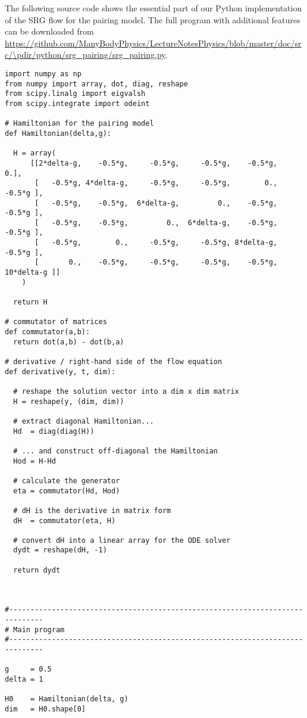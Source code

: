 The following source code shows the essential part of our Python implementation of
the SRG flow for the pairing model. The full program with additional features can 
be downloaded from 
\url{https://github.com/ManyBodyPhysics/LectureNotesPhysics/blob/master/doc/src/\pdir/python/srg_pairing/srg_pairing.py}.


\begin{lstlisting}
import numpy as np
from numpy import array, dot, diag, reshape
from scipy.linalg import eigvalsh
from scipy.integrate import odeint

# Hamiltonian for the pairing model
def Hamiltonian(delta,g):

  H = array(
      [[2*delta-g,    -0.5*g,     -0.5*g,     -0.5*g,    -0.5*g,          0.],
       [   -0.5*g, 4*delta-g,     -0.5*g,     -0.5*g,        0.,     -0.5*g ], 
       [   -0.5*g,    -0.5*g,  6*delta-g,         0.,    -0.5*g,     -0.5*g ], 
       [   -0.5*g,    -0.5*g,         0.,  6*delta-g,    -0.5*g,     -0.5*g ], 
       [   -0.5*g,        0.,     -0.5*g,     -0.5*g, 8*delta-g,     -0.5*g ], 
       [       0.,    -0.5*g,     -0.5*g,     -0.5*g,    -0.5*g, 10*delta-g ]]
    )

  return H

# commutator of matrices
def commutator(a,b):
  return dot(a,b) - dot(b,a)

# derivative / right-hand side of the flow equation
def derivative(y, t, dim):

  # reshape the solution vector into a dim x dim matrix
  H = reshape(y, (dim, dim))

  # extract diagonal Hamiltonian...
  Hd  = diag(diag(H))

  # ... and construct off-diagonal the Hamiltonian
  Hod = H-Hd

  # calculate the generator
  eta = commutator(Hd, Hod)

  # dH is the derivative in matrix form 
  dH  = commutator(eta, H)

  # convert dH into a linear array for the ODE solver
  dydt = reshape(dH, -1)
    
  return dydt



#------------------------------------------------------------------------------
# Main program
#------------------------------------------------------------------------------

g     = 0.5
delta = 1

H0    = Hamiltonian(delta, g)
dim   = H0.shape[0]


\end{lstlisting}
